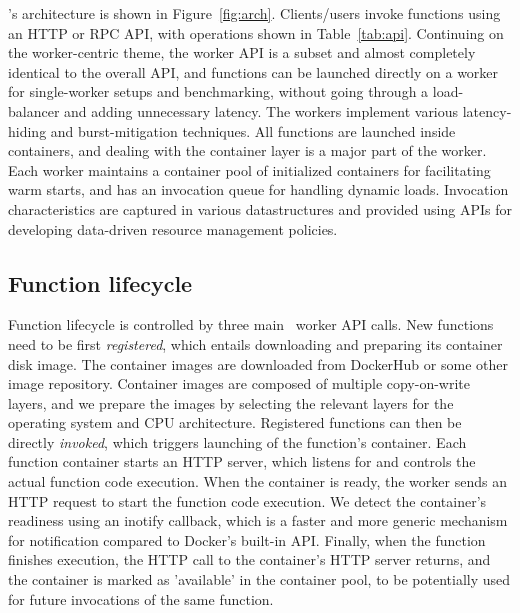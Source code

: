 \sysname's architecture is shown in Figure~\ref{fig:arch}.
Clients/users invoke functions using an HTTP or RPC API, with operations shown in Table~\ref{tab:api}. 
Continuing on the worker-centric theme, the worker API is a subset and almost completely identical to the overall API, and functions can be launched directly on a worker for single-worker setups and benchmarking, without going through a load-balancer and adding unnecessary latency.
The workers implement various latency-hiding and burst-mitigation techniques. 
All functions are launched inside containers, and dealing with the container layer is a major part of the worker. 
Each worker maintains a container pool of initialized containers for facilitating warm starts, and has an invocation queue for handling dynamic loads.
Invocation characteristics are captured in various datastructures and provided using APIs for developing data-driven resource management policies. 




\subsection{Function lifecycle}

Function lifecycle is controlled by three main \sysname~worker API calls.
New functions need to be first \emph{registered}, which entails downloading and preparing its container disk image.
The container images are downloaded from DockerHub or some other image repository.
Container images are composed of multiple copy-on-write layers, and we prepare the images by selecting the relevant layers for the operating system and CPU architecture.
%
Registered functions can then be directly \emph{invoked}, which triggers launching of the function's container. 
Each function container starts an HTTP server, which listens for and controls the actual function code execution.
When the container is ready, the worker sends an HTTP request to start the function code execution.
We detect the container's readiness using an inotify callback, which is a faster and more generic mechanism for notification compared to Docker's built-in API. 
%
Finally, when the function finishes execution, the HTTP call to the container's HTTP server returns, and the container is marked as  'available' in the container pool, to be potentially used for future invocations of the same function.


